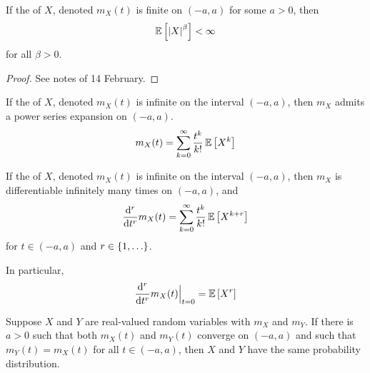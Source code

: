 \documentclass[11pt]{article}
\begin{document}
\begin{thm}
    If the \mgf{} of $X$,
    denoted $m_X(t)$ is finite on $(-a, a)$
    for some $a > 0$,
    then
    \begin{equation*}
        \operatorname{\mathbb{E}}{\left[\left\lvert X\right\rvert^\beta\right]} < \infty
    \end{equation*}
    for all $\beta > 0$.
\end{thm}

\begin{proof}
    See notes of 14 February.
\end{proof}

\begin{thm}
    If the \mgf{} of $X$, denoted $m_X(t)$ is infinite on the interval
    $(-a, a)$,
    then $m_X$ admits a power series expansion on $(-a, a)$.
    \begin{equation*}
        m_X(t)
        = \sum^\infty_{k=0} {
            \frac{t^k}{k!}
            \operatorname{\mathbb{E}}{\left[X^k\right]}
        }
    \end{equation*}
\end{thm}

\omittedproof

\begin{cor}
    If the \mgf{} of $X$, denoted $m_X(t)$ is infinite on the interval
    $(-a, a)$,
    then $m_X$ is differentiable infinitely many times on $(-a, a)$,
    and
    \begin{equation*}
        \frac{\mathrm{d}^{r}}{\mathrm{d} {t}^{r}} m_X(t)
        =
        \sum^\infty_{k=0} {
            \frac{t^k}{k!}
            \operatorname{\mathbb{E}}{\left[X^{k+r}\right]}
        }
    \end{equation*}
    for $t \in (-a, a)$ and $r \in \range[1]{}$.

    In particular,
    \begin{equation*}
        \nderiv{r}{t} m_X(t) \evaluated{t=0} = \E{X^r}
    \end{equation*}
\end{cor}

\begin{thm}
    Suppose $X$ and $Y$ are real-valued random variables
    with \mgf{} $m_X$ and $m_Y$.
    If there is $a > 0$ such that both $m_X(t)$ and $m_Y(t)$ converge on
    $(-a, a)$ and such that $m_Y(t) = m_X(t)$ for all $t \in (-a, a)$,
    then $X$ and $Y$ have the same probability distribution.
\end{thm}

\omittedproof
\end{document}
